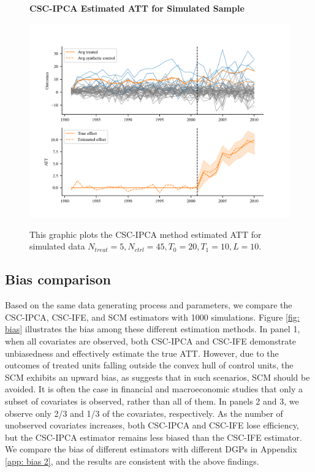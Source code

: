 \documentclass[12pt]{article}
\begin{document}
\begin{figure}[!ht]
    \centering
    \caption{\textbf{CSC-IPCA Estimated ATT for Simulated Sample}}
    \includegraphics{figs/estimation.png}
    \label{fig: est}
    \caption*{\footnotesize{This graphic plots the CSC-IPCA method estimated ATT for simulated data $N_{treat} = 5, N_{ctrl} = 45, T_0=20, T_1=10, L=10$.}}
    \end{figure}

\subsection{Bias comparison}

Based on the same data generating process and parameters, we compare the CSC-IPCA, CSC-IFE, and SCM estimators with 1000 simulations. Figure \ref{fig: bias} illustrates the bias among these different estimation methods. In panel 1, when all covariates are observed, both CSC-IPCA and CSC-IFE demonstrate unbiasedness and effectively estimate the true ATT. However, due to the outcomes of treated units falling outside the convex hull of control units, the SCM exhibits an upward bias, as \cite{abadie2010synthetic} suggests that in such scenarios, SCM should be avoided. It is often the case in financial and macroeconomic studies that only a subset of covariates is observed, rather than all of them. In panels 2 and 3, we observe only 2/3 and 1/3 of the covariates, respectively. As the number of unobserved covariates increases, both CSC-IPCA and CSC-IFE lose efficiency, but the CSC-IPCA estimator remains less biased than the CSC-IFE estimator. We compare the bias of different estimators with different DGPs in Appendix \ref{app: bias 2}, and the results are consistent with the above findings.
\end{document}
